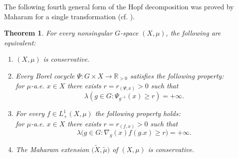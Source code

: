 \documentclass{amsart}
\numberwithin{equation}{subsection}
\newtheorem{mainthm}{Theorem}
\renewcommand{\themainthm}{\Alph{mainthm}}
\begin{document}
The following fourth general form of the Hopf decomposition was proved by Maharam for a single transformation (cf. \cite[Proposition 4.34]{arano2021ergodic}).

\renewcommand{\themainthm}{D}
\begin{mainthm}
\label{mthm:maharam}
For every nonsingular \(G\)-space \(\left(X,\mu\right)\), the following are equivalent:
\begin{enumerate}
    \item \(\left(X,\mu\right)\) is conservative.
    \item Every Borel cocycle \(\Psi:G\times X\to\mathbb{R}_{>0}\) satisfies the following property:\\
    for \(\mu\)-a.e. \(x\in X\) there exists \(r=r_{\left(\Psi,x\right)}>0\) such that
    \[\lambda\left(g\in G:\Psi_{g^{-1}}\left(x\right)\geq r\right)=+\infty.\]
    \item For every \(f\in L_{+}^{1}\left(X,\mu\right)\) the following  property holds:\\
    for \(\mu\)-a.e. \(x\in X\) there exists \(r=r_{\left(f,x\right)}>0\) such that
    \[\lambda\big(g\in G:\nabla_{g}\left(x\right)f\left(g.x\right)\geq r\big)=+\infty.\]
    \item The Maharam extension \(\big(\widetilde{X},\widetilde{\mu}\big)\) of \(\left(X,\mu\right)\) is conservative.
\end{enumerate}
\end{mainthm}
\renewcommand{\themainthm}{\Alph{mainthm}}
\end{document}
